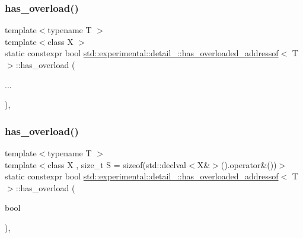 \subsubsection{\texorpdfstring{has\+\_\+overload()}{has\_overload()}\hspace{0.1cm}{\footnotesize\ttfamily [1/2]}}
{\footnotesize\ttfamily template$<$typename T $>$ \\
template$<$class X $>$ \\
static constexpr bool \mbox{\hyperlink{structstd_1_1experimental_1_1detail___1_1has__overloaded__addressof}{std\+::experimental\+::detail\+\_\+\+::has\+\_\+overloaded\+\_\+addressof}}$<$ T $>$\+::has\+\_\+overload (\begin{DoxyParamCaption}\item[{}]{... }\end{DoxyParamCaption})\hspace{0.3cm}{\ttfamily [inline]}, {\ttfamily [static]}}

\mbox{\label{structstd_1_1experimental_1_1detail___1_1has__overloaded__addressof_a3afc4b4cc2df22327c0f380cec60fb1f}} 
\subsubsection{\texorpdfstring{has\+\_\+overload()}{has\_overload()}\hspace{0.1cm}{\footnotesize\ttfamily [2/2]}}
{\footnotesize\ttfamily template$<$typename T $>$ \\
template$<$class X , size\+\_\+t S = sizeof(std\+::declval$<$\+X\&$>$().\+operator\&())$>$ \\
static constexpr bool \mbox{\hyperlink{structstd_1_1experimental_1_1detail___1_1has__overloaded__addressof}{std\+::experimental\+::detail\+\_\+\+::has\+\_\+overloaded\+\_\+addressof}}$<$ T $>$\+::has\+\_\+overload (\begin{DoxyParamCaption}\item[{bool}]{ }\end{DoxyParamCaption})\hspace{0.3cm}{\ttfamily [inline]}, {\ttfamily [static]}}



